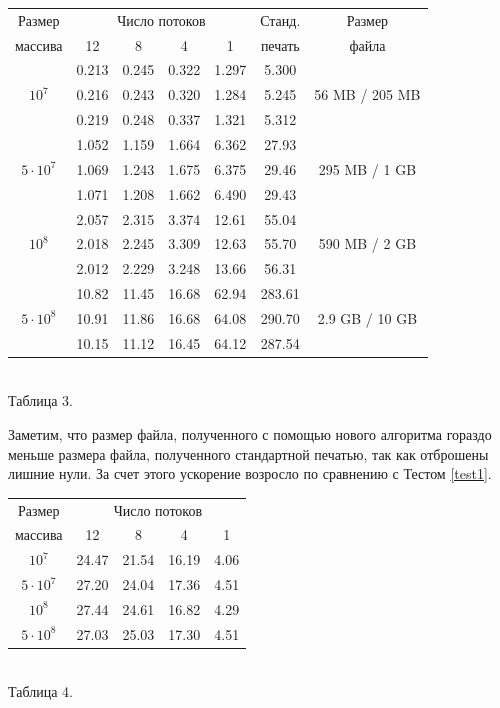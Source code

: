 \begin{center}
\begin{tabular}{||c|c|c|c|c|c|c||}
\hline
\hline
Размер & \multicolumn{4}{c|}{Число потоков} & Станд. & Размер\\
\hhline{~|-|-|-|-|~|~|}
массива & 12 & 8 & 4 & 1 & печать & файла\\
\hline
\hline
 & 0.213 & 0.245 & 0.322 & 1.297 & 5.300  &\\
\hhline{~|-|-|-|-|-|}
$10^7$ & 0.216 & 0.243 & 0.320 & 1.284 & 5.245  &56 MB / 205 MB \\
\hhline{~|-|-|-|-|-|}
 & 0.219 & 0.248 & 0.337 & 1.321 & 5.312  &\\
\hline
& 1.052 & 1.159 & 1.664 & 6.362 & 27.93  &\\
\hhline{~|-|-|-|-|-|}
$5 \cdot 10^7$& 1.069 & 1.243 & 1.675 & 6.375 & 29.46  &295 MB / 1 GB\\
\hhline{~|-|-|-|-|-|}
& 1.071  & 1.208 & 1.662 & 6.490 & 29.43  &\\
\hline
 & 2.057 & 2.315 & 3.374 & 12.61 & 55.04 & \\
\hhline{~|-|-|-|-|-|}
$10^8$ & 2.018 & 2.245 & 3.309 & 12.63 & 55.70  & 590 MB / 2 GB \\
\hhline{~|-|-|-|-|-|}
 & 2.012 & 2.229 & 3.248 & 13.66 & 56.31  &\\
\hline
 & 10.82 & 11.45 & 16.68 & 62.94 & 283.61  &\\
\hhline{~|-|-|-|-|-|}
$5 \cdot 10^8$ & 10.91 & 11.86 & 16.68 & 64.08 & 290.70  &2.9 GB / 10 GB\\
\hhline{~|-|-|-|-|-|}
 & 10.15 & 11.12 & 16.45 & 64.12 & 287.54  &\\
\hline
\hline
\end{tabular}
\\\vspace{10pt}
\small{Таблица 3.}
\end{center}

Заметим, что размер файла, полученного с помощью нового алгоритма гораздо меньше размера файла, полученного стандартной печатью, так как отброшены лишние нули.
За счет этого ускорение возросло по сравнению с Тестом \ref{test1}.

\begin{center}
\begin{tabular}{||c|c|c|c|c||}
\hline
\hline
Размер & \multicolumn{4}{c|}{Число потоков}\\
\hhline{~|-|-|-|-|}
массива & 12 & 8 & 4 & 1 \\
\hline
$10^7$  & 24.47 & 21.54 & 16.19 & 4.06 \\
\hline
$5 \cdot 10^7$ & 27.20 & 24.04 & 17.36 & 4.51 \\
\hline
$10^8$ & 27.44 & 24.61 & 16.82 & 4.29 \\
\hline
$5 \cdot 10^8$ & 27.03 & 25.03 & 17.30 & 4.51 \\
\hline
\hline
\end{tabular}
\\\vspace{10pt}
\small{Таблица 4.}
\end{center}

